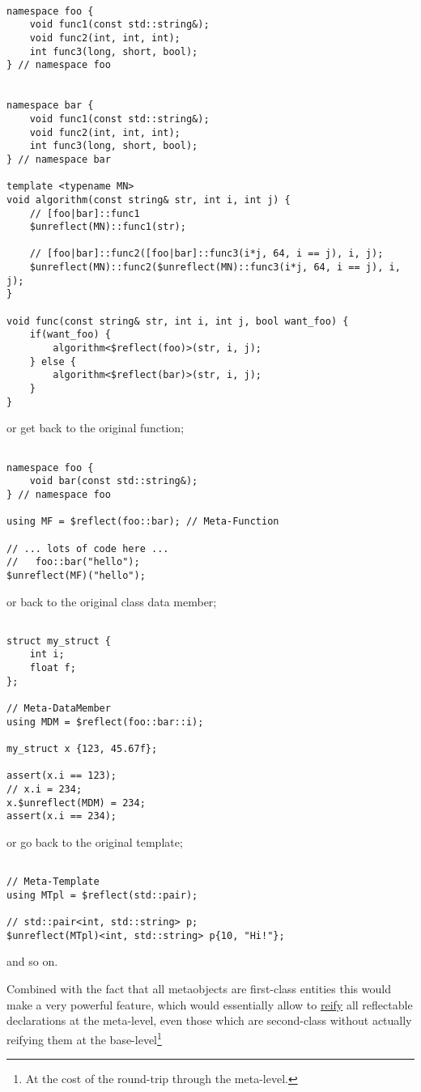 \begin{verbatim}

namespace foo {
	void func1(const std::string&);
	void func2(int, int, int);
	int func3(long, short, bool);
} // namespace foo


namespace bar {
	void func1(const std::string&);
	void func2(int, int, int);
	int func3(long, short, bool);
} // namespace bar

template <typename MN>
void algorithm(const string& str, int i, int j) {
	// [foo|bar]::func1
	$unreflect(MN)::func1(str);

	// [foo|bar]::func2([foo|bar]::func3(i*j, 64, i == j), i, j);
	$unreflect(MN)::func2($unreflect(MN)::func3(i*j, 64, i == j), i, j);
}

void func(const string& str, int i, int j, bool want_foo) {
	if(want_foo) {
		algorithm<$reflect(foo)>(str, i, j);
	} else {
		algorithm<$reflect(bar)>(str, i, j);
	}
}

\end{verbatim}

or get back to the original function;

\begin{verbatim}

namespace foo {
	void bar(const std::string&);
} // namespace foo

using MF = $reflect(foo::bar); // Meta-Function

// ... lots of code here ...
//   foo::bar("hello");
$unreflect(MF)("hello");

\end{verbatim}

or back to the original class data member;

\begin{verbatim}

struct my_struct {
	int i;
	float f;
};

// Meta-DataMember
using MDM = $reflect(foo::bar::i);

my_struct x {123, 45.67f};

assert(x.i == 123);
// x.i = 234;
x.$unreflect(MDM) = 234;
assert(x.i == 234);

\end{verbatim}

or go back to the original template;

\begin{verbatim}

// Meta-Template
using MTpl = $reflect(std::pair);

// std::pair<int, std::string> p;
$unreflect(MTpl)<int, std::string> p{10, "Hi!"};

\end{verbatim}

and so on.

Combined with the fact that all metaobjects are first-class
entities this would make a very powerful feature, which would essentially
allow to \hyperref[term-reification]{reify} all reflectable declarations at
the meta-level, even those which are
second-class without actually reifying them at the base-level\footnote
{At the cost of the round-trip through the meta-level.}

